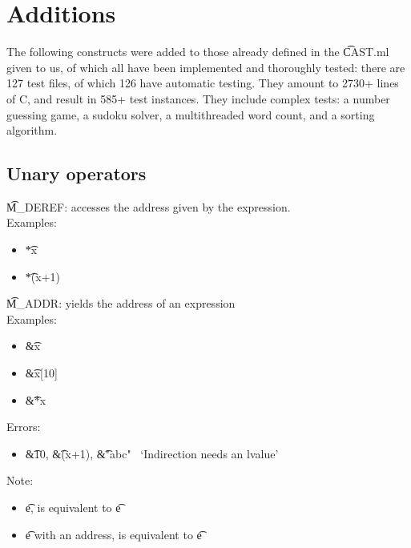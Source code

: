 \section{Additions}

The following constructs were added to those already defined in the \t{CAST.ml} given to us, of which all have been implemented and thoroughly tested: there are 127 test files, of which 126 have automatic testing. They amount to 2730+ lines of C\textminus\textminus, and result in 585+ test instances. They include complex tests: a number guessing game, a sudoku solver, a multithreaded word count, and a sorting algorithm.

\subsection{Unary operators}
\t{M\_DEREF}: accesses the address given by the expression.\\
Examples:
\begin{itemize}
    \item \t{*x} \to\ 
    \item \t{*(x+1)} \to\ 
\end{itemize}

\t{M\_ADDR}: yields the address of an expression\\
Examples:
\begin{itemize}
    \item \t{\&x} \to\ 
    \item \t{\&x[10]} \to\ 
    \item \t{\&*x} \to\ 
\end{itemize}
Errors:
\begin{itemize}
    \item \t{\&10}, \t{\&(x+1)}, \t{\&"abc"} \to\ `Indirection needs an lvalue'
\end{itemize}

Note:
\begin{itemize}
    \item \forall \t{e},  is equivalent to \t{e}
    \item \forall \t{e} with an address,  is equivalent to \t{e}
\end{itemize}


